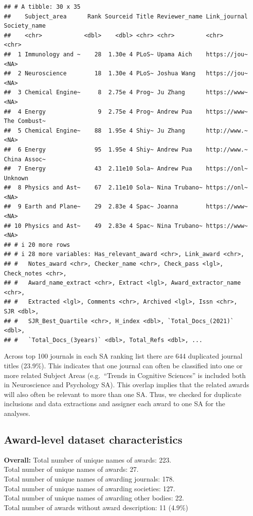 \documentclass[
]{article}
\begin{document}
\begin{verbatim}
## # A tibble: 30 x 35
##    Subject_area      Rank Sourceid Title Reviewer_name Link_journal Society_name
##    <chr>            <dbl>    <dbl> <chr> <chr>         <chr>        <chr>       
##  1 Immunology and ~    28  1.30e 4 PLoS~ Upama Aich    https://jou~ <NA>        
##  2 Neuroscience        18  1.30e 4 PLoS~ Joshua Wang   https://jou~ <NA>        
##  3 Chemical Engine~     8  2.75e 4 Prog~ Ju Zhang      https://www~ <NA>        
##  4 Energy               9  2.75e 4 Prog~ Andrew Pua    https://www~ The Combust~
##  5 Chemical Engine~    88  1.95e 4 Shiy~ Ju Zhang      http://www.~ <NA>        
##  6 Energy              95  1.95e 4 Shiy~ Andrew Pua    http://www.~ China Assoc~
##  7 Energy              43  2.11e10 Sola~ Andrew Pua    https://onl~ Unknown     
##  8 Physics and Ast~    67  2.11e10 Sola~ Nina Trubano~ https://onl~ <NA>        
##  9 Earth and Plane~    29  2.83e 4 Spac~ Joanna        https://www~ <NA>        
## 10 Physics and Ast~    49  2.83e 4 Spac~ Nina Trubano~ https://www~ <NA>        
## # i 20 more rows
## # i 28 more variables: Has_relevant_award <chr>, Link_award <chr>,
## #   Notes_award <chr>, Checker_name <chr>, Check_pass <lgl>, Check_notes <chr>,
## #   Award_name_extract <chr>, Extract <lgl>, Award_extractor_name <chr>,
## #   Extracted <lgl>, Comments <chr>, Archived <lgl>, Issn <chr>, SJR <dbl>,
## #   SJR_Best_Quartile <chr>, H_index <dbl>, `Total_Docs_(2021)` <dbl>,
## #   `Total_Docs_(3years)` <dbl>, Total_Refs <dbl>, ...
\end{verbatim}

Across top 100 journals in each SA ranking list there are 644 duplicated
journal titles (23.9\%). This indicates that one journal can often be
classified into one or more related Subject Areas (e.g.~``Trends in
Cognitive Sciences'' is included both in Neuroscience and Psychology
SA). This overlap implies that the related awards will also often be
relevant to more than one SA. Thus, we checked for duplicate inclusions
and data extractions and assigner each award to one SA for the analyses.

\hypertarget{award-level-dataset-characteristics}{%
\subsection{Award-level dataset
characteristics}\label{award-level-dataset-characteristics}}

\textbf{Overall:} Total number of unique names of awards: 223.\\
Total number of unique names of awards: 27.\\
Total number of unique names of awarding journals: 178.\\
Total number of unique names of awarding societies: 127.\\
Total number of unique names of awarding other bodies: 22.\\
Total number of awards without award description: 11 (4.9\%)
\end{document}

